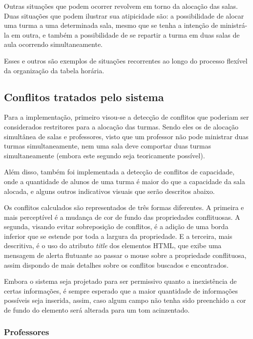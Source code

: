 Outras situações que podem ocorrer revolvem em torno da alocação das salas. Duas situações que podem ilustrar sua atipicidade são: a possibilidade de alocar uma turma a uma determinada sala, mesmo que se tenha a intenção de ministrá-la em outra, e também a possibilidade de se repartir a turma em duas salas de aula ocorrendo simultaneamente.

Esses e outros são exemplos de situações recorrentes ao longo do processo flexível da organização da tabela horária.

\subsection{Conflitos tratados pelo sistema}

Para a implementação, primeiro visou-se a detecção de conflitos que poderiam ser considerados restritores para a alocação das turmas. Sendo eles os de alocação simultânea de salas e professores, visto que um professor não pode ministrar duas turmas simultaneamente, nem uma sala deve comportar duas turmas simultaneamente (embora este segundo seja teoricamente possível).

Além disso, também foi implementada a detecção de conflitos de capacidade, onde a quantidade de alunos de uma turma é maior do que a capacidade da sala alocada, e alguns outros indicativos visuais que serão descritos abaixo.

Os conflitos calculados são representados de três formas diferentes. A primeira e mais perceptível é a mudança de cor de fundo das propriedades conflituosas. A segunda, visando evitar sobreposição de conflitos, é a adição de uma borda inferior que se estende por toda a largura da propriedade. E a terceira, mais descritiva, é o uso do atributo \textit{title} dos elementos HTML, que exibe uma mensagem de alerta flutuante ao passar o mouse sobre a propriedade conflituosa, assim dispondo de mais detalhes sobre os conflitos buscados e encontrados.

Embora o sistema seja projetado para ser permissivo quanto a inexistência de certas informações, é sempre esperado que a maior quantidade de informações possíveis seja inserida, assim, caso algum campo não tenha sido preenchido a cor de fundo do elemento será alterada para um tom acinzentado.


\subsubsection{Professores}

